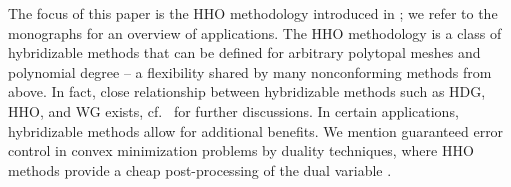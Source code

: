 \documentclass[a4paper]{amsart}
\numberwithin{equation}{section}
\theoremstyle{definition}
\theoremstyle{remark}
\numberwithin{theorem}{section}
\numberwithin{equation}{section}
\numberwithin{table}{section}
\numberwithin{figure}{section}
\begin{document}
The focus of this paper is the HHO methodology introduced in \cite{DiPietroErnLemaire2014,DiPietroErn2015}; we refer to the monographs \cite{DiPietoDroniou2020,CicuttinErnPignet2021} for an overview of applications.
The HHO methodology is a class of hybridizable methods that can be defined for arbitrary polytopal meshes and polynomial degree -- a flexibility shared by many nonconforming methods from above. In fact, close relationship between hybridizable methods such as HDG, HHO, and WG exists, cf.~\cite{Cockburn2016,CockburnDiPietroErn2016,CicuttinErnPignet2021} for further discussions. In certain applications, hybridizable methods allow for additional benefits. We mention guaranteed error control in convex minimization problems by duality techniques, where HHO methods provide a cheap post-processing of the dual variable \cite{CarstensenTran2021,Tran2024}.
\end{document}

